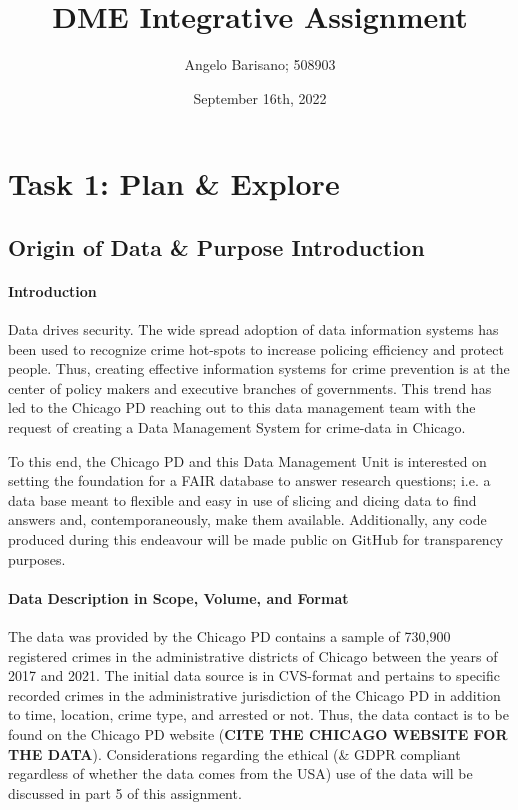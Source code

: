 \documentclass[a4paper]{article}
\begin{document}
\title{DME Integrative Assignment}
\author{Angelo Barisano; 508903 }
\date{September 16th, 2022}
\maketitle

\newpage
\section{Task 1: Plan \& Explore}

\subsection{Origin of Data \& Purpose Introduction}
\paragraph{Introduction} Data drives security. The wide spread adoption of data information systems has been used to recognize crime hot-spots to increase policing efficiency and protect people. Thus, creating effective information systems for crime prevention is at the center of policy makers and executive branches of governments. This trend has led to the Chicago PD reaching out to this data management team with the request of creating a Data Management System for crime-data in Chicago.

To this end, the Chicago PD and this Data Management Unit is interested on setting the foundation for a FAIR database to answer research questions; i.e. a data base meant to flexible and easy in use of slicing and dicing data to find answers and, contemporaneously, make them available. Additionally, any code produced during this endeavour will be made public on GitHub for transparency purposes. 

\paragraph{Data Description in Scope, Volume, and Format}
The data was provided by the Chicago PD contains a sample of 730,900 registered crimes in the administrative districts of Chicago between the years of 2017 and 2021. The initial data source is in CVS-format and pertains to specific recorded crimes in the administrative jurisdiction of the Chicago PD in addition to time, location, crime type, and arrested or not. Thus, the data contact is to be found on the Chicago PD website (\textbf{CITE THE CHICAGO WEBSITE FOR THE DATA}). Considerations regarding the ethical (\& GDPR compliant regardless of whether the data comes from the USA) use of the data will be discussed in part 5 of this assignment.
\end{document}
